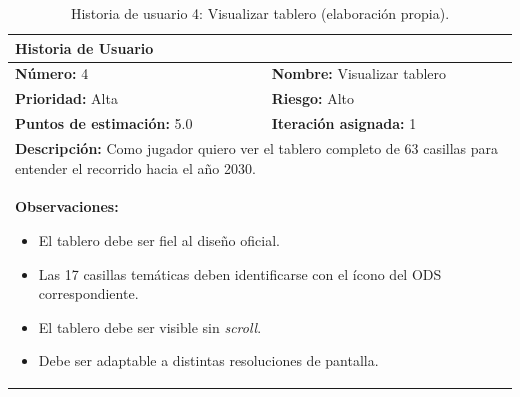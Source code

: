 \begin{table}[H]
\centering
\caption{Historia de usuario 4: Visualizar tablero (elaboración propia).\label{tab:hu4}}
\renewcommand{\arraystretch}{1.5}
\begin{tabular}{|p{}|p{}|}
\hline
\multicolumn{2}{|l|}{\textbf{Historia de Usuario}} \\
\hline
\textbf{Número:} 4 & \textbf{Nombre:} Visualizar tablero \\
\hline
\textbf{Prioridad:} Alta & \textbf{Riesgo:} Alto \\
\hline
\textbf{Puntos de estimación:} 5.0 & \textbf{Iteración asignada:} 1 \\
\hline
\multicolumn{2}{|p{0.945\textwidth}|}{\textbf{Descripción:} Como jugador quiero ver el tablero completo de 63 casillas para entender el recorrido hacia el año 2030.} \\
\hline
\multicolumn{2}{|p{0.945\textwidth}|}{\textbf{Observaciones:}
\vspace{-0.5em}
\begin{itemize}
    \setlength\itemsep{0em}
    \item El tablero debe ser fiel al diseño oficial.
    \item Las 17 casillas temáticas deben identificarse con el ícono del ODS correspondiente.
    \item El tablero debe ser visible sin \textit{scroll}.
    \item Debe ser adaptable a distintas resoluciones de pantalla.
\end{itemize}
\vspace{-1em}
} \\
\hline
\end{tabular}
\end{table}

